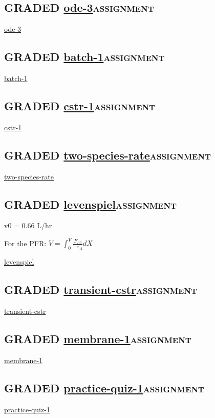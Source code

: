 \documentclass[11pt]{article}
\begin{document}
\subsection{{\bfseries\sffamily GRADED} \url{ode-3}\hfill{}\textsc{assignment}}
\label{ode-3}
\url{ode-3}

\subsection{{\bfseries\sffamily GRADED} \url{batch-1}\hfill{}\textsc{assignment}}
\label{batch-1}
\url{batch-1}

\subsection{{\bfseries\sffamily GRADED} \url{cstr-1}\hfill{}\textsc{assignment}}
\label{cstr-1}
\url{cstr-1}

\subsection{{\bfseries\sffamily GRADED} \url{two-species-rate}\hfill{}\textsc{assignment}}
\label{two-species-rate}
\url{two-species-rate}

\subsection{{\bfseries\sffamily GRADED} \url{levenspiel}\hfill{}\textsc{assignment}}
\label{levenspiel}
v0 = 0.66 L/hr

For the PFR: \(V =  \int_0^V \frac{F_{A0}}{-r_A} dX\)

\url{levenspiel}

\subsection{{\bfseries\sffamily GRADED} \url{transient-cstr}\hfill{}\textsc{assignment}}
\label{transient-cstr}
\url{transient-cstr}

\subsection{{\bfseries\sffamily GRADED} \url{membrane-1}\hfill{}\textsc{assignment}}
\label{membrane-1}
\url{membrane-1}

\subsection{{\bfseries\sffamily GRADED} \url{practice-quiz-1}\hfill{}\textsc{assignment}}
\label{practice-quiz-1}
\url{practice-quiz-1}
\end{document}
